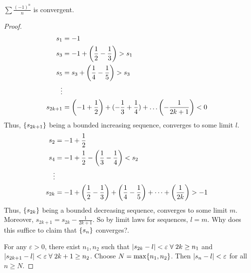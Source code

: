 \documentclass[12pt]{article}
\begin{document}
\begin{example}
    $\sum \frac{(-1)^{n}}{n}$ is convergent.
\end{example}
\begin{proof}
    \begin{align*}
        s_{1} &= -1 \\
        s_{3} &= -1 + \paren{\frac{1}{2} - \frac{1}{3}} > s_{1} \\
        s_{5} &= s_{3} + \paren{\frac{1}{4} - \frac{1}{5}} > s_{3} \\
        \vdots \\
        s_{2k+1} &= \paren{-1 + \frac{1}{2}} + (-\frac{1}{3} + \frac{1}{4}) + \dots \paren{-\frac{1}{2k+1}} < 0
    \end{align*}
    Thus, $\set{s_{2k+1}}$ being a bounded increasing sequence, converges to some limit $l$.
    \begin{align*}
        s_{2} &= -1 + \frac{1}{2} \\
        s_{4} &= -1 + \frac{1}{2} - \paren{\frac{1}{3} - \frac{1}{4}} < s_{2} \\
        \vdots \\
        s_{2k} &= -1 + \paren{\frac{1}{2} - \frac{1}{3}} + \paren{\frac{1}{4} - \frac{1}{5}} + \dots + \paren{\frac{1}{2k}} > -1
    \end{align*}
    Thus, $\set{s_{2k}}$ being a bounded decreasing sequence, converges to some limit $m$. Moreover, $s_{2k+1} = s_{2k} - \frac{1}{2k + 1}$. So by limit laws for sequences, $l = m$. \textcolor{red!80!black}{Why does this suffice to claim that $\set{s_{n}}$ converges?}.

    For any $\varepsilon > 0$, there exist $n_{1}, n_{2}$ such that $\abs{ s_{2k} - l } < \varepsilon \;\forall\; 2k \geq n_{1}$ and $\abs{ s_{2k+1} - l } < \varepsilon \;\forall\; 2k + 1 \geq  n_{2}$. Choose $N = \max \set{n_{1}, n_{2}}$. Then $\abs{ s_{n} - l } < \varepsilon$ for all $n \geq  N$.
\end{proof}
\end{document}
